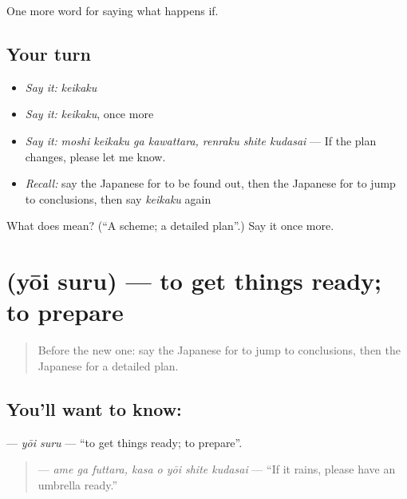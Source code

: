 \begin{grammarlens}[title={What you've built}]
One more word for saying what happens if.
\end{grammarlens}

\subsection*{Your turn}
\begin{itemize}
\raggedright
  \item \emph{Say it:} \emph{keikaku}
  \item \emph{Say it:} \emph{keikaku}, once more
  \item \emph{Say it:} \emph{moshi keikaku ga kawattara, renraku shite kudasai} — If the plan changes, please let me know.
  \item \emph{Recall:} say the Japanese for to be found out, then the Japanese for to jump to conclusions, then say \emph{keikaku} again
\end{itemize}

\begin{tcolorbox}[breakable,colback=teal!4,colframe=teal!35!black,title={Before you move on}]
What does  mean? (\textquotedblleft{}A scheme; a detailed plan\textquotedblright{}.) Say it once more.
\end{tcolorbox}
\section[\texorpdfstring{\ja{よういする} (yōi suru)}{よういする (yōi suru)}]{ (yōi suru) — to get things ready; to prepare}

\label{lesson:JA-C344-youi-suru}



\begin{quote}
Before the new one: say the Japanese for to jump to conclusions, then the Japanese for a detailed plan.
\end{quote}

\subsection*{You'll want to know: }
\textbf{} — \emph{yōi suru} — \textquotedblleft{}to get things ready; to prepare\textquotedblright{}.

\begin{quote}
\textbf{   } — \emph{ame ga futtara, kasa o yōi shite kudasai} — \textquotedblleft{}If it rains, please have an umbrella ready.\textquotedblright{}
\end{quote}


